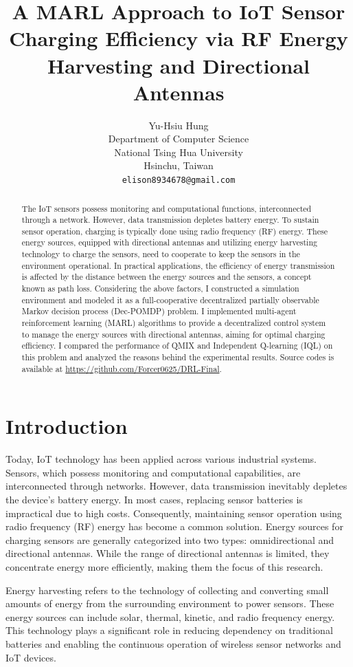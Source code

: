 \documentclass{article}
\title{A MARL Approach to IoT Sensor Charging Efficiency via RF Energy Harvesting and Directional Antennas}
\author{
  Yu-Hsiu Hung  \\
  Department of Computer Science\\
  National Tsing Hua University\\
  Hsinchu, Taiwan \\
  \texttt{elison8934678@gmail.com} \\
}
\begin{document}
\maketitle


\begin{abstract}
The IoT sensors possess monitoring and computational functions, interconnected through a network. However, data transmission depletes battery energy. To sustain sensor operation, charging is typically done using radio frequency (RF) energy. These energy sources, equipped with directional antennas and utilizing energy harvesting technology to charge the sensors, need to cooperate to keep the sensors in the environment operational. In practical applications, the efficiency of energy transmission is affected by the distance between the energy sources and the sensors, a concept known as path loss. Considering the above factors, I constructed a simulation environment and modeled it as a full-cooperative decentralized partially observable Markov decision process (Dec-POMDP) problem. I implemented multi-agent reinforcement learning (MARL) algorithms to provide a decentralized control system to manage the energy sources with directional antennas, aiming for optimal charging efficiency. I compared the performance of QMIX and Independent Q-learning (IQL) on this problem and analyzed the reasons behind the experimental results. Source codes is available at \href{https://github.com/Forcer0625/DRL-Final}{https://github.com/Forcer0625/DRL-Final}.
\end{abstract}


\section{Introduction}


Today, IoT technology has been applied across various industrial systems. Sensors, which possess monitoring and computational capabilities, are interconnected through networks. However, data transmission inevitably depletes the device's battery energy. In most cases, replacing sensor batteries is impractical due to high costs. Consequently, maintaining sensor operation using radio frequency (RF) energy has become a common solution. Energy sources for charging sensors are generally categorized into two types: omnidirectional and directional antennas. While the range of directional antennas is limited, they concentrate energy more efficiently, making them the focus of this research.

Energy harvesting refers to the technology of collecting and converting small amounts of energy from the surrounding environment to power sensors. These energy sources can include solar, thermal, kinetic, and radio frequency energy. This technology plays a significant role in reducing dependency on traditional batteries and enabling the continuous operation of wireless sensor networks and IoT devices.
\end{document}
